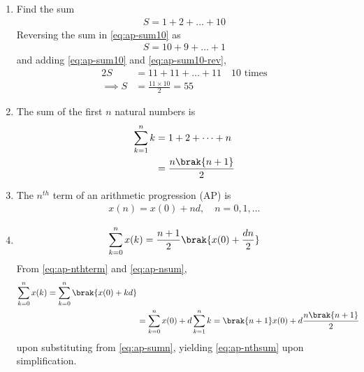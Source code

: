 \begin{enumerate}[label=\thesubsection.\arabic*,ref=\thesubsection.\theenumi]
	\item Find the sum
\begin{align}
	\label{eq:ap-sum10}
	S = 1 + 2 + \dots + 10
\end{align}
\solution Reversing the sum in
	\eqref{eq:ap-sum10}
	as
\begin{align}
	\label{eq:ap-sum10-rev}
	S = 10 + 9 + \dots + 1
\end{align}
and adding 
	\eqref{eq:ap-sum10}
	and
	\eqref{eq:ap-sum10-rev},
\begin{align}
	\label{eq:ap-sum10-add}
	2S &= 11 + 11 + \dots + 11 \quad 10 \text{ times}
	\\
	\implies S &= \frac{11 \times 10}{2} = 55
\end{align}
\item The sum of the first $n$ natural numbers is
\begin{align}
	\sum_{k=1}^{n}k &= 1+ 2 + \dots + n
	\\
	&= \frac{n\brak{n+1}}{2}
	\label{eq:ap-sumn}
\end{align}
\item The $n^{th}$ term of an arithmetic progression (AP) is
\begin{align}
	\label{eq:ap-nthterm}
	x(n) = x(0) + nd, \quad n = 0, 1, \dots
\end{align}
\item 
\begin{align}
	\label{eq:ap-nsum}
	 \sum_{k=0}^{n}x(k) = \frac{n+1}{2}\brak{x(0) + \frac{dn}{2}}
\end{align}
\solution
From
	\eqref{eq:ap-nthterm}
	and
	\eqref{eq:ap-nsum},
\begin{align}
	\label{eq:ap-nthsum}
	 \sum_{k=0}^{n}x(k) = 
\sum_{k=0}^{n}
	 \brak{x(0) + kd} 
	 \\
	 &= 
\sum_{k=0}^{n}x(0) + 
d\sum_{k=1}^{n}k
	  = \brak{n+1}x(0) + d\frac{n\brak{n+1}}{2}
\end{align}
upon substituting from
	\eqref{eq:ap-sumn}, yielding
	\eqref{eq:ap-nthsum}
	upon simplification.
\end{enumerate}

